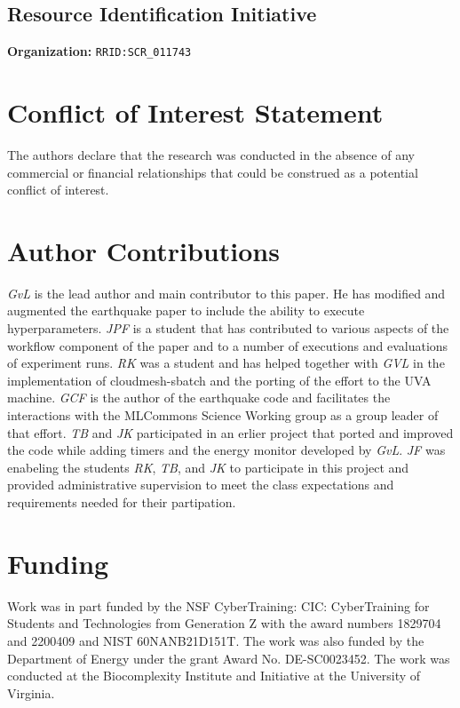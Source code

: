 \documentclass[utf8]{FrontiersinVancouver} %
\begin{document}
{\subsection{Resource Identification Initiative}

{\bf Organization:} \verb|RRID:SCR_011743|

\section*{Conflict of Interest Statement}

The authors declare that the research was conducted in the absence of
any commercial or financial relationships that could be construed as a
potential conflict of interest.

\section*{Author Contributions}

{\em GvL} is the lead author and main contributor to this paper. He
has modified and augmented the earthquake paper to include the ability
to execute hyperparameters. {\em JPF} is a student that has
contributed to various aspects of the workflow component of the paper
and to a number of executions and evaluations of experiment runs. {\em
  RK} was a student and has helped together with {\em GVL} in the
implementation of cloudmesh-sbatch and the porting of the effort to
the UVA machine.  {\em GCF} is the author of the earthquake code and
facilitates the interactions with the MLCommons Science Working group
as a group leader of that effort. {\em TB} and {\em JK} participated
in an erlier project that ported and improved the code while adding
timers and the energy monitor developed by {\em GvL}. {\em JF} was
enabeling the students {\em RK}, {\em TB}, and {\em JK} to participate
in this project and provided administrative supervision to meet the
class expectations and requirements needed for their partipation.

\section*{Funding}

Work was in part funded by the NSF CyberTraining: CIC: CyberTraining
for Students and Technologies from Generation Z with the award numbers
1829704 and 2200409 and NIST 60NANB21D151T.  The work was also funded
by the Department of Energy under the grant Award
No. DE-SC0023452. The work was conducted at the Biocomplexity
Institute and Initiative at the University of Virginia.

}
\end{document}
